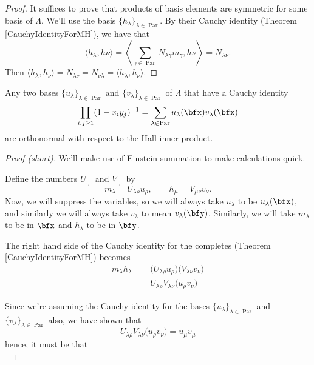 \documentclass{article}
\DeclareMathOperator{\Par}{Par}
\begin{document}
\begin{proof}
    It suffices to prove that products of basis elements are symmetric for some basis of $\Lambda$.
    We'll use the basis $\{h_\lambda\}_{\lambda\in\Par}$.
    By their Cauchy identity (Theorem \ref{CauchyIdentityForMH}), we have that
    \[
        \langle h_\lambda, h\nu \rangle = \left\langle \sum_{\gamma\in\Par} N_{\lambda\gamma} m_\gamma, h\nu \right\rangle = N_{\lambda\nu}.
    \]
    Then $\langle h_\lambda, h_\nu \rangle = N_{\lambda\nu} = N_{\nu\lambda} = \langle h_\lambda, h_\nu \rangle$.
\end{proof}

\begin{theorem}\label{thm:CauchyIdentityImpliesOrthonormal}
    Any two bases $\{u_\lambda\}_{\lambda\in\Par}$ and $\{v_\lambda\}_{\lambda\in\Par}$ of $\Lambda$ that have a Cauchy identity
    \begin{equation}\label{eq:CauchyIdentityArbitrary}
        \prod_{i,j \geq 1}(1 - x_iy_j)^{-1}
        =
        \sum_{\lambda\in\Par}
        u_\lambda(\bfx) v_\lambda(\bfx)
    \end{equation}
    are orthonormal with respect to the Hall inner product.
\end{theorem}

\begin{proof}[Proof (short)]
    We'll make use of \href{https://en.wikipedia.org/wiki/Einstein_notation}{Einstein summation} to make calculations quick.

    Define the numbers $U_{\cdot,\cdot}$ and $V_{\cdot,\cdot}$ by
    \[
        m_\lambda = U_{\lambda\rho} u_\rho, \qquad h_\mu = V_{\mu\nu} v_\nu.
    \]
    Now, we will suppress the variables, so we will always take $u_\lambda$ to be $u_\lambda(\bfx)$, and similarly we will always take $v_\lambda$ to mean $v_\lambda(\bfy)$.
    Similarly, we will take $m_\lambda$ to be in $\bfx$ and $h_\lambda$ to be in $\bfy$.

    The right hand side of the Cauchy identity for the completes (Theorem \ref{CauchyIdentityForMH}) becomes
    \begin{align*}
        m_\lambda h_\lambda &= \Big(U_{\lambda\rho}u_\rho\Big)\Big(V_{\lambda\nu}v_\nu\Big) \\
                                                                                &= U_{\lambda\rho}V_{\lambda\nu} \Big(u_\rho v_\nu\Big)
    \end{align*}

    Since we're assuming the Cauchy identity for the bases $\{u_\lambda\}_{\lambda\in\Par}$ and $\{v_\lambda\}_{\lambda\in\Par}$ also, we have shown that
    \[
        U_{\lambda\rho}V_{\lambda\nu} \Big(u_\rho v_\nu\Big) = u_\mu v_\mu
    \]
    hence, it must be that
    \[
    \]
\end{proof}
\end{document}
